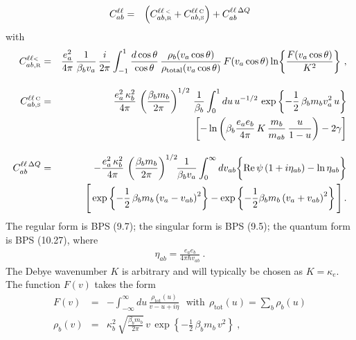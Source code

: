 \documentclass[preprint,12pt,eqsecnum,nofootinbib,amsmath,amssymb]{revtex4}
\newcommand{\smC}{{\rm\scriptscriptstyle C}}
\newcommand{\smR}{{\rm\scriptscriptstyle R}}
\newcommand{\smS}{{\rm\scriptscriptstyle S}}
\newcommand{\smLT}{{\rm\scriptscriptstyle <}}
\begin{document}
\begin{eqnarray}
  C_{ab}^{\ell\ell} 
  &=&  
  \Big(C^{\ell\ell\,\smLT}_{ab,\smR}  
  + 
  C^{\ell\ell\,\smC}_{ab,\smS} \Big) 
  +
  C^{\ell\ell \, \Delta Q}_{ab} 
\label{all}
\end{eqnarray}
with 
\begin{eqnarray}
  C^{\ell\ell\smLT}_{ab,\smR}
  &=&
  \frac{e_a^2}{4 \pi}\, \frac{1}{\beta_b v_a}\,
  \frac{i}{2 \pi}
  \int_{-1}^1   \frac{d\cos\theta}{\cos\theta} \,
  \frac{\rho_b(v_a\cos\theta)}
  {\rho_{\rm total}(v_a\cos\theta)}\,F(v_a \cos\theta) 
  \ln\!\left\{\frac{F(v_a\cos\theta)}{K^2}\right\} \,, 
\label{nun}
\\[10pt]
  C^{\ell\ell \, \smC}_{ab,\smS}
  &=& 
  \frac{e_a^2\,\kappa^2_b}{4\pi} \,   
  \left( \frac{\beta_b m_b}{2\pi} \right)^{1/2} \, \frac{1}{\beta_b}
  \int_0^1 du \, u^{-1/2} \,\exp\left\{ - \frac{1}{2} \,
  \beta_b m_b v^2_a \, u \right\}
\nonumber\\
  && \qquad
  \left[ -\ln \left(\beta_b  \frac{e_a e_b}{4\pi} \,
  K \, \frac{m_b}{m_{ab}} \, \frac{u}{1-u} \right) 
  - 2 \gamma \right] 
\label{wonderclassic}
\\[10pt]
  C^{\ell\ell \, \Delta Q}_{ab}
  &=&
  -\frac{e_a^2\, \kappa_b^2}{4 \pi}\,
  \left( \frac{\beta_b m_b}{2\pi} \right)^{1/2} \! \!
   \frac{1}{\beta_b v_a}
  \int_0^\infty dv_{ab}
  \bigg\{ {\rm Re} \, \psi \left( 1 + i \eta_{ab}
  \right) - \ln \eta_{ab}  \bigg\}
\nonumber\\
  &&
  \Bigg[ \exp\left\{ - \frac{1}{2}\, \beta_b
  m_b \left( v_a - v_{ab} \right)^2\right\} 
  - \exp\left\{ - \frac{1}{2} \beta_b m_b \left( v_a + v_{ab} 
  \right)^2\right\} 
\Bigg]	\,.
\label{regb}
\end{eqnarray}
The regular form is  BPS (9.7); the singular form is BPS (9.5);
the quantum form is BPS (10.27), where
\begin{eqnarray}
\eta_{ab}= \frac{e_a e_b}{4\pi\hbar v_{ab}} \ .
\end{eqnarray}
The Debye wavenumber $K$ is arbitrary and will typically be chosen as
$K=\kappa_e$. The function $F(v)$ takes the form
\begin{eqnarray}
  F(v) 
  &=& 
  -\int_{-\infty}^\infty \! du \, 
  \frac{\rho_\text{tot}(u)}{v - u + i\eta} 
  ~~~\text{with}~~
  \rho_\text{tot}(u)=\sum_b\rho_b(u)
\label{Fdef}
\\[5pt]
  \rho_b(v) 
  &=& 
  \kappa_b^2\,\sqrt{\frac{\beta_b m_b}{2\pi}}\, v\,
  \exp\!\left\{-\frac{1}{2}\,\beta_b m_b\, v^2\right\} \ ,
\label{rhototdef}
\end{eqnarray}
\end{document}
